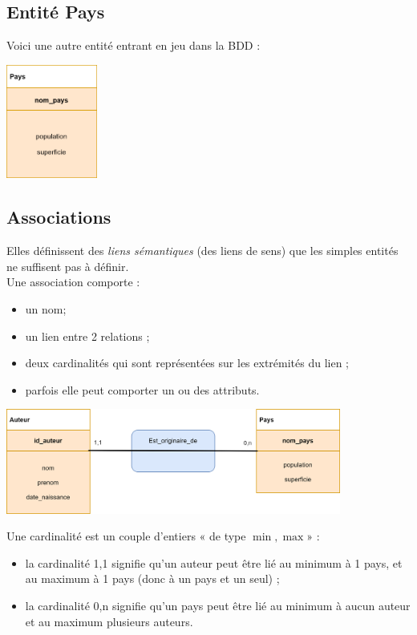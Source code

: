 \documentclass[10pt,cours,a4paper,firamath]{nsi}
\begin{document}
\subsection{Entité Pays}
Voici une autre entité entrant en jeu dans la BDD :
\begin{center}
    \includegraphics[width=3cm]{img/pays}
\end{center}


\subsection{Associations}
Elles définissent des \textit{liens sémantiques} (des liens de sens)	 que les simples entités ne suffisent pas à définir.\\

Une association comporte :
\begin{itemize}
    \item	un nom;
    \item 	un lien entre 2 relations ;
    \item	deux cardinalités qui sont représentées sur les extrémités du lien ;
    \item 	parfois elle peut comporter un ou des attributs.
\end{itemize}

\begin{exemple}[]
    \begin{center}
        \includegraphics[width=11cm]{img/schema_1}
    \end{center}
    Une cardinalité est un couple d'entiers « de type $\min, \max$» :
    \begin{itemize}
        \item	la cardinalité 1,1 signifie qu'un auteur peut être lié au minimum à 1 pays, et au maximum à 1 pays (donc à un pays et un seul) ;
        \item	la cardinalité 0,n signifie qu'un pays peut être lié au minimum à aucun auteur et au maximum plusieurs auteurs.
    \end{itemize}
\end{exemple}
\end{document}
